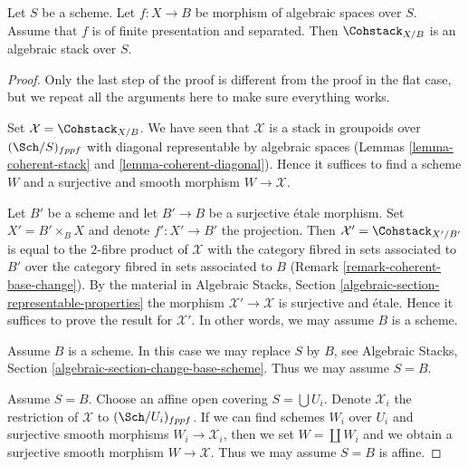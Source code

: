 %
\begin{theorem}
\label{theorem-coherent-algebraic-general}
Let $S$ be a scheme. Let $f : X \to B$ be morphism of algebraic spaces
over $S$. Assume that $f$ is of finite presentation and separated. Then
$\Cohstack_{X/B}$ is an algebraic stack over $S$.
\end{theorem}

\begin{proof}
Only the last step of the proof is different from the proof
in the flat case, but we repeat all the arguments here to make 
sure everything works.

\medskip\noindent
Set $\mathcal{X} = \Cohstack_{X/B}$. We have seen that $\mathcal{X}$
is a stack in groupoids over $(\Sch/S)_{fppf}$ with diagonal representable
by algebraic spaces
(Lemmas \ref{lemma-coherent-stack} and \ref{lemma-coherent-diagonal}).
Hence it suffices to find a scheme $W$ and a surjective and smooth
morphism $W \to \mathcal{X}$.

\medskip\noindent
Let $B'$ be a scheme and let $B' \to B$ be a surjective \'etale morphism.
Set $X' = B' \times_B X$ and denote $f' : X' \to B'$ the projection.
Then $\mathcal{X}' = \Cohstack_{X'/B'}$ is equal to the $2$-fibre
product of $\mathcal{X}$ with the category fibred in sets
associated to $B'$ over the category fibred in sets associated to $B$
(Remark \ref{remark-coherent-base-change}). By the material in
Algebraic Stacks, Section \ref{algebraic-section-representable-properties}
the morphism $\mathcal{X}' \to \mathcal{X}$ is surjective and \'etale.
Hence it suffices to prove the result for $\mathcal{X}'$.
In other words, we may assume $B$ is a scheme.

\medskip\noindent
Assume $B$ is a scheme. In this case we may replace $S$ by $B$, see
Algebraic Stacks, Section \ref{algebraic-section-change-base-scheme}.
Thus we may assume $S = B$.

\medskip\noindent
Assume $S = B$. Choose an affine open covering $S = \bigcup U_i$.
Denote $\mathcal{X}_i$ the restriction of $\mathcal{X}$ to
$(\Sch/U_i)_{fppf}$. If we can find schemes $W_i$ over $U_i$ and
surjective smooth morphisms $W_i \to \mathcal{X}_i$, then we
set $W = \coprod W_i$ and we obtain a surjective smooth morphism
$W \to \mathcal{X}$. Thus we may assume $S = B$ is affine.


\end{proof}
